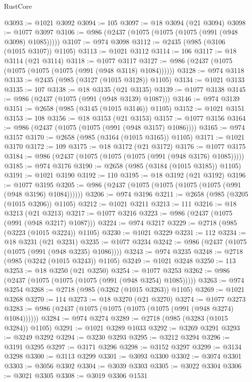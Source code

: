 \begin{lexlean}{RustCore}
\begin{coremodule}
@3093 := @1021 @3092
@3094 := 105
@3097 := @18 @3094 (@21 @3094)
@3098 := @1077 @3097
@3106 := @986 (@2437 (@1075 (@1075 (@1075 (@991 (@948 @3098) @1085)))))
@3107 := @974 @3098
@3112 := @2435 (@985 (@3106 (@1015 @3107)) @1105)
@3113 := @1021 @3112
@3114 := 106
@3117 := @18 @3114 (@21 @3114)
@3118 := @1077 @3117
@3127 := @986 (@2437 (@1075 (@1075 (@1075 (@1075 (@991 (@948 @3118) @1084))))))
@3128 := @974 @3118
@3133 := @2435 (@985 (@3127 (@1015 @3128)) @1105)
@3134 := @1021 @3133
@3135 := 107
@3138 := @18 @3135 (@21 @3135)
@3139 := @1077 @3138
@3145 := @986 (@2437 (@1075 (@991 (@948 @3139) @1087)))
@3146 := @974 @3139
@3151 := @2658 (@985 (@3145 (@1015 @3146)) @1105)
@3152 := @1021 @3151
@3153 := 108
@3156 := @18 @3153 (@21 @3153)
@3157 := @1077 @3156
@3164 := @986 (@2437 (@1075 (@1075 (@991 (@948 @3157) @1086))))
@3165 := @974 @3157
@3170 := @2658 (@985 (@3164 (@1015 @3165)) @1105)
@3171 := @1021 @3170
@3172 := 109
@3175 := @18 @3172 (@21 @3172)
@3176 := @1077 @3175
@3184 := @986 (@2437 (@1075 (@1075 (@1075 (@991 (@948 @3176) @1085)))))
@3185 := @974 @3176
@3190 := @2658 (@985 (@3184 (@1015 @3185)) @1105)
@3191 := @1021 @3190
@3192 := 110
@3195 := @18 @3192 (@21 @3192)
@3196 := @1077 @3195
@3205 := @986 (@2437 (@1075 (@1075 (@1075 (@1075 (@991 (@948 @3196) @1084))))))
@3206 := @974 @3196
@3211 := @2658 (@985 (@3205 (@1015 @3206)) @1105)
@3212 := @1021 @3211
@3213 := 111
@3216 := @18 @3213 (@21 @3213)
@3217 := @1077 @3216
@3223 := @986 (@2437 (@1075 (@991 (@948 @3217) @1087)))
@3224 := @974 @3217
@3229 := @2718 (@985 (@3223 (@1015 @3224)) @1105)
@3230 := @1021 @3229
@3231 := 112
@3234 := @18 @3231 (@21 @3231)
@3235 := @1077 @3234
@3242 := @986 (@2437 (@1075 (@1075 (@991 (@948 @3235) @1086))))
@3243 := @974 @3235
@3248 := @2718 (@985 (@3242 (@1015 @3243)) @1105)
@3249 := @1021 @3248
@3250 := 113
@3253 := @18 @3250 (@21 @3250)
@3254 := @1077 @3253
@3262 := @986 (@2437 (@1075 (@1075 (@1075 (@991 (@948 @3254) @1085)))))
@3263 := @974 @3254
@3268 := @2718 (@985 (@3262 (@1015 @3263)) @1105)
@3269 := @1021 @3268
@3270 := 114
@3273 := @18 @3270 (@21 @3270)
@3274 := @1077 @3273
@3283 := @986 (@2437 (@1075 (@1075 (@1075 (@1075 (@991 (@948 @3274) @1084))))))
@3284 := @974 @3274
@3289 := @2718 (@985 (@3283 (@1015 @3284)) @1105)
@3291 := @1021 @3289 @1033
@3292 := @3269 @3291
@3293 := @3249 @3292
@3294 := @3230 @3293
@3295 := @3212 @3294
@3296 := @3191 @3295
@3297 := @3171 @3296
@3298 := @3152 @3297
@3299 := @3134 @3298
@3300 := @3113 @3299
@3301 := @3093 @3300
@3302 := @3074 @3301
@3303 := @3056 @3302
@3304 := @3039 @3303
@3305 := @3022 @3304
@3306 := @3021 @3305
@3308 := @3019 @3306 @1531

\end{coremodule}
\end{lexlean}
